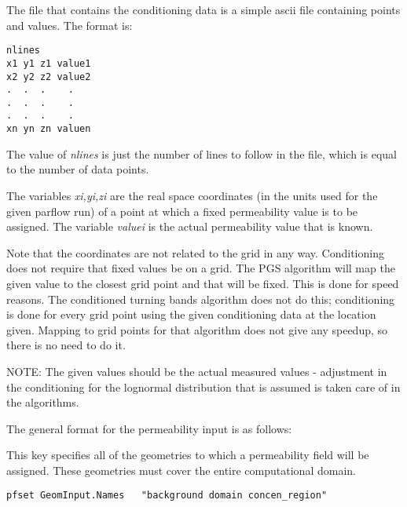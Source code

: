 The file that contains the conditioning data is a simple ascii file
containing points and values. The format is:

\begin{display}\begin{verbatim}
nlines
x1 y1 z1 value1
x2 y2 z2 value2
.  .  .    .
.  .  .    .
.  .  .    .
xn yn zn valuen
\end{verbatim}\end{display}

The value of {\em nlines} is just the number
of lines to follow in the file, which 
is equal to the number of data points.

The variables {\em xi,yi,zi} are the real space coordinates (in the
units used for the given parflow run) of
a point at which a fixed permeability value
is to be assigned. The variable {\em valuei} is the actual permeability
value that is known. 

Note that the coordinates
are not related to the grid in any way. Conditioning
does not require that fixed values be on a 
grid. The PGS algorithm
will map the given value to the closest grid point
and that will be fixed. This is done for speed reasons.
The conditioned turning bands algorithm does not do
this; conditioning is done for every grid point using
the given conditioning data at the location given.
Mapping to grid points for that algorithm does not give
any speedup, so there is no need to do it.

NOTE: The given values should be the actual measured
values - adjustment in the conditioning for the lognormal
distribution that is assumed is taken care of in the algorithms.

The general format for the permeability input is as follows:

{
This key specifies all of the geometries to which a permeability field 
will be assigned.  These geometries must cover the entire computational
domain.
}
\begin{display}\begin{verbatim}
pfset GeomInput.Names   "background domain concen_region"
\end{verbatim}\end{display}

